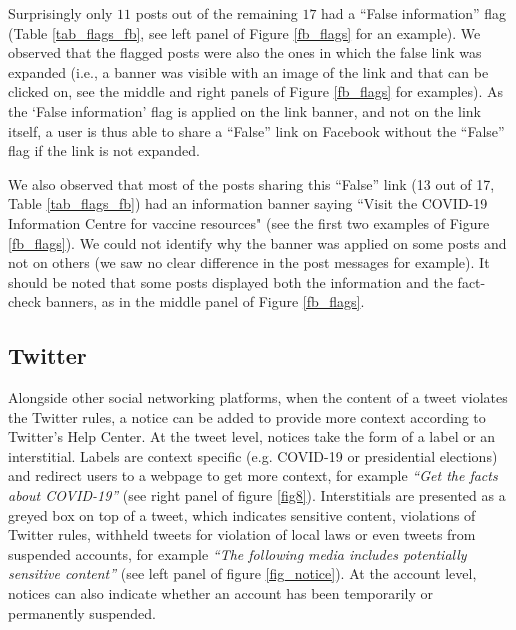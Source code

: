 \documentclass{article}
\begin{document}
\smallskip

Surprisingly only $11$ posts out of the remaining $17$ had a ``False information'' flag  (Table \ref{tab_flags_fb}, see left panel of Figure \ref{fb_flags} for an example). We observed that the flagged posts were also the ones in which the false link was expanded (i.e., a banner was visible with an image of the link and that can be clicked on, see the middle and right panels of Figure \ref{fb_flags} for examples). As the ‘False information’ flag is applied on the link banner, and not on the link itself, a user is thus able to share a ``False'' link on Facebook without the ``False'' flag if the link is not expanded.

\smallskip

We also observed that most of the posts sharing this ``False'' link (13 out of 17, Table \ref{tab_flags_fb}) had an information banner saying ``Visit the COVID-19 Information Centre for vaccine resources" (see the first two examples of Figure \ref{fb_flags}). We could not identify why the banner was applied on some posts and not on others (we saw no clear difference in the post messages for example). It should be noted that some posts displayed both the information and the fact-check banners, as in the middle panel of Figure \ref{fb_flags}.

\subsection{Twitter}

Alongside other social networking platforms, when the content of a tweet violates the Twitter rules, a notice can be added to provide more context according to Twitter's Help Center. At the tweet level, notices take the form of a label or an interstitial. Labels are context specific (e.g. COVID-19 or presidential elections) and  redirect users to a webpage to get more context, for example {\it ``Get the facts about COVID-19''} (see right panel of figure \ref{fig8}). Interstitials are presented as a greyed box on top of a tweet, which indicates sensitive content, violations of Twitter rules, withheld tweets for violation of local laws or even tweets from suspended accounts, for example {\it ``The following media includes potentially sensitive content''} (see left panel of figure \ref{fig_notice}). At the account level, notices can also indicate whether an account has been temporarily or permanently suspended. 

\end{document}
